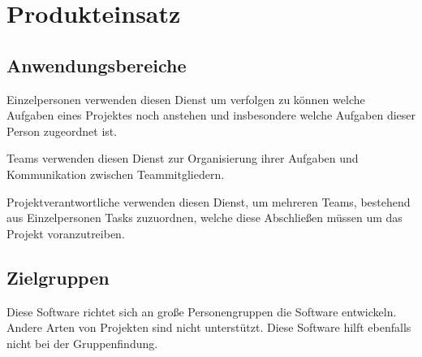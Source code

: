 
\section{Produkteinsatz}

\subsection{Anwendungsbereiche}
Einzelpersonen verwenden diesen Dienst um verfolgen zu können welche Aufgaben eines Projektes noch anstehen und insbesondere welche Aufgaben dieser Person zugeordnet ist. \par Teams verwenden diesen Dienst zur Organisierung ihrer Aufgaben und Kommunikation zwischen Teammitgliedern. \par Projektverantwortliche verwenden diesen Dienst, um mehreren Teams, bestehend aus Einzelpersonen Tasks zuzuordnen, welche diese Abschließen müssen um das Projekt voranzutreiben.

\subsection{Zielgruppen}
Diese Software richtet sich an große Personengruppen die Software entwickeln. Andere Arten von Projekten sind nicht unterstützt. Diese Software hilft ebenfalls nicht bei der Gruppenfindung.
